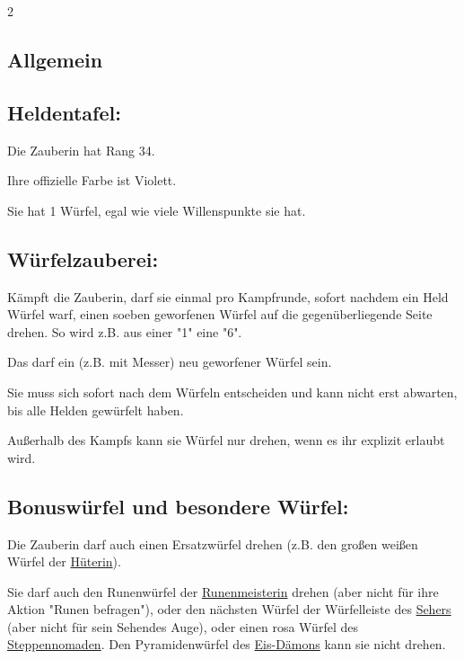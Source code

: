 \documentclass[10pt, a4paper, oneside]{book}
\begin{document}
\begin{multicols*}{2}\raggedcolumns


\begin{nobgcolor}

\section{Allgemein}



\subsection{Heldentafel:}

Die Zauberin hat Rang 34.

Ihre offizielle Farbe ist Violett.

Sie hat 1 Würfel, egal wie viele Willenspunkte sie hat.




\subsection{Würfelzauberei:}

Kämpft die Zauberin, darf sie einmal pro Kampfrunde, sofort nachdem ein Held Würfel warf, einen soeben geworfenen Würfel auf die gegenüberliegende Seite drehen. So wird z.B. aus einer "1" eine "6".

Das darf ein (z.B. mit Messer) neu geworfener Würfel sein.

Sie muss sich sofort nach dem Würfeln entscheiden und kann nicht erst abwarten, bis alle Helden gewürfelt haben.
\supercite{DLvA:Begleitheft,DlH:Begleitheft,DeK:Begleitheft}

Außerhalb des Kampfs kann sie Würfel nur drehen, wenn es ihr explizit erlaubt wird.




\subsection{Bonuswürfel und besondere Würfel:}

Die Zauberin darf auch einen Ersatzwürfel drehen (z.B. den großen weißen Würfel der \hyperref[Hüterin]{Hüterin}\supercite{5335}).
\supercite{DLvA:Begleitheft,DLvA2:Runensteine,DRidN:Begleitheft}

Sie darf auch den Runenwürfel der \hyperref[Runenmeisterin]{Runenmeisterin} drehen\supercite{88563} (aber nicht für ihre Aktion "Runen befragen"), oder den nächsten Würfel der Würfelleiste des \hyperref[Seher]{Sehers} (aber nicht für sein Sehendes Auge)\supercite{DH:FAQ}, oder einen rosa Würfel des \hyperref[Steppennomade]{Steppennomaden}. Den Pyramidenwürfel des \hyperref[Eis-Dämon]{Eis-Dämons} kann sie nicht drehen.
\supercite{91842}






\end{nobgcolor}
\end{multicols*}
\end{document}
